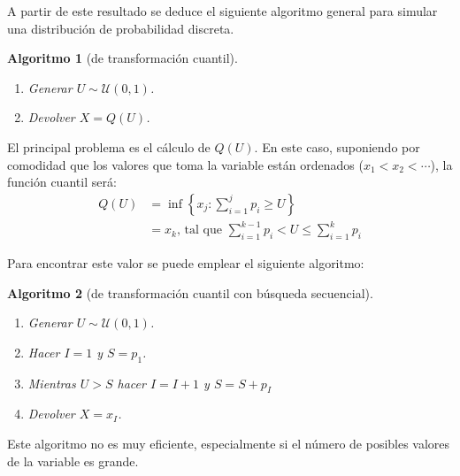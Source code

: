 \documentclass[
  10pt,
]{book}
\theoremstyle{break}
\newtheorem{conjecture}{Algoritmo}[chapter]
\theoremstyle{nonumberplain}
\begin{document}
A partir de este resultado se deduce el siguiente algoritmo general para simular una distribución de probabilidad discreta.

\begin{conjecture}[de transformación cuantil]

\begin{enumerate}
\def\labelenumi{\arabic{enumi}.}
\item
  Generar \(U\sim \mathcal{U}\left( 0,1\right)\).
\item
  Devolver \(X=Q\left( U\right)\).
\end{enumerate}

\end{conjecture}

El principal problema es el cálculo de \(Q\left( U\right)\).
En este caso, suponiendo por comodidad que los valores que toma la variable están ordenados (\(x_{1}<x_{2}<\cdots\)), la función cuantil será:
\[\begin{array}{ll}
Q\left( U\right) &=\inf \left\{ x_{j}:\sum_{i=1}^{j}p_{i}\geq U\right\} \\
&=x_{k}\text{, tal que }\sum_{i=1}^{k-1}p_{i}<U\leq \sum_{i=1}^{k}p_{i}
\end{array}\]

Para encontrar este valor se puede emplear el siguiente algoritmo:

\begin{conjecture}[de transformación cuantil con búsqueda secuencial]

\begin{enumerate}
\def\labelenumi{\arabic{enumi}.}
\item
  Generar \(U\sim \mathcal{U}\left( 0,1\right)\).
\item
  Hacer \(I=1\) y \(S=p_{1}\).
\item
  Mientras \(U>S\) hacer \(I=I+1\) y \(S=S+p_{I}\)
\item
  Devolver \(X=x_{I}\).
\end{enumerate}

\end{conjecture}

Este algoritmo no es muy eficiente, especialmente si el número de posibles valores de la variable es grande.
\end{document}
